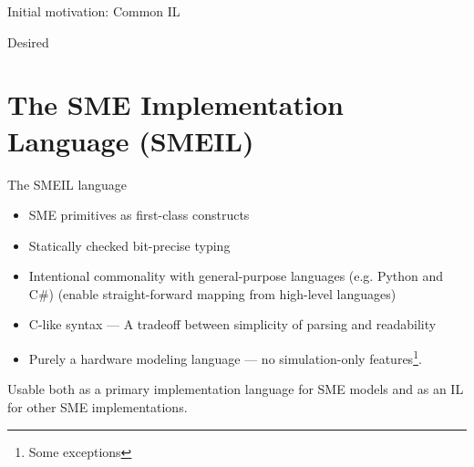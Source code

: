 \documentclass{beamer}
\begin{document}
\begin{frame}{Initial motivation: Common IL}
\begin{minipage}[t]{.49\linewidth}
{}
  \begin{center}Desired
  \end{center}
\end{minipage}


\end{frame}



\section{The SME Implementation Language (SMEIL)}
\begin{frame}{The SMEIL language}
  \begin{itemize}
  \item SME primitives as first-class constructs
  \item Statically checked bit-precise typing
  \item Intentional commonality with general-purpose languages (e.g. Python and
    C\#) (enable straight-forward mapping from high-level languages)
  \item C-like syntax --- A tradeoff between simplicity of parsing and
    readability
  \item Purely a hardware modeling language --- no simulation-only
    features\footnote{Some exceptions}.
  \end{itemize}

  \pause
  \begin{block}{}
  Usable both as a primary implementation language for SME models and as an IL
  for other SME implementations.
\end{block}
\end{frame}
\end{document}
